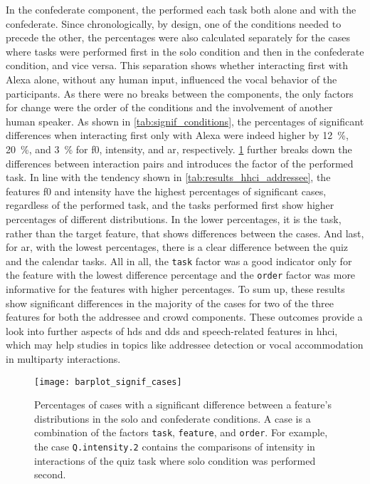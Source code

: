 %
In the confederate component, the performed each task both alone and with the confederate.
Since chronologically, by design, one of the conditions needed to precede the other, the percentages were also calculated separately for the cases where tasks were performed first in the solo condition and then in the confederate condition, and vice versa.
This separation shows whether interacting first with Alexa alone, without any human input, influenced the vocal behavior of the participants.
As there were no breaks between the components, the only factors for change were the order of the conditions and the involvement of another human speaker.
As shown in \cref{tab:signif_conditions}, the percentages of significant differences when interacting first only with Alexa were indeed higher by \SI{12}{\percent}, \SI{20}{\percent}, and \SI{3}{\percent} for \ac{f0}, intensity, and \ac{ar}, respectively.
\cref{fig:signif_cases_ordered} further breaks down the differences between interaction pairs and introduces the factor of the performed task.
In line with the tendency shown in \cref{tab:results_hhci_addressee}, the features \ac{f0} and intensity have the highest percentages of significant cases, regardless of the performed task, and the tasks performed first show higher percentages of different distributions.
In the lower percentages, it is the task, rather than the target feature, that shows differences between the cases.
And last, for \ac{ar}, with the lowest percentages, there is a clear difference between the quiz and the calendar tasks.
All in all, the \texttt{task} factor was a good indicator only for the feature with the lowest difference percentage and the \texttt{order} factor was more informative for the features with higher percentages.
To sum up, these results show significant differences in the majority of the cases for two of the three features for both the addressee and crowd components.
These outcomes provide a look into further aspects of \ac{hds} and \ac{dds} and speech-related features in \ac{hhci}, which may help studies in topics like addressee detection or vocal accommodation in  multiparty interactions.
%
%
\begin{figure}[t]
	\centering
	\texttt{[image: barplot\_signif\_cases]}
	\caption[Per-case comparisons of distributional differences in the crowd component]
		{Percentages of cases with a significant difference between a feature's distributions in the solo and confederate conditions.
		A case is a combination of the factors \texttt{task}, \texttt{feature}, and \texttt{order}.
		For example, the case \texttt{Q.intensity.2} contains the comparisons of intensity in interactions of the quiz task where solo condition was performed second.}
	\label{fig:signif_cases_ordered}
\end{figure}

